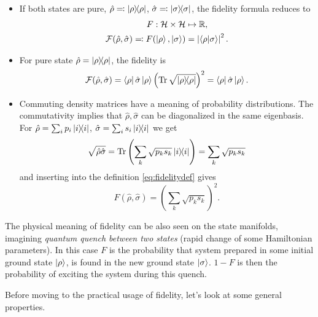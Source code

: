 \begin{itemize}
    \item If both states are pure, $\hat\rho\eqqcolon\ket{\rho}\!\!\bra{\rho}$, $\hat\sigma\eqqcolon\ket{\sigma}\!\!\bra{\sigma}$, the fidelity formula reduces to
    \begin{equation}
        \begin{split}    
            F: \mathcal{H}\times\mathcal{H}&\mapsto \mathbb{R}, \\
            \mathcal F(\hat\rho,\hat\sigma)  \eqqcolon F(\ket{\rho},\ket{\sigma}) &= \left| \braket{\rho|\sigma}\right|^2.
        \end{split}
    \end{equation}

    \item For pure state $\hat\rho=\ket{\rho}\!\!\bra{\rho}$, the fidelity is
    \begin{equation}
        \mathcal F(\hat\rho,\hat\sigma) = \bra{\rho}\hat\sigma \ket{\rho} \left(\operatorname{\textrm{Tr}}\sqrt{\ket{\rho}\!\!\bra{\rho}} \right)^2 = \bra{\rho}\hat\sigma \ket{\rho}.
    \end{equation}
    
    \item Commuting density matrices have a meaning of probability distributions. The commutativity implies that $\hat\rho,\hat\sigma$ can be diagonalized in the same eigenbasis. For $\hat\rho = \sum_i p_i \ket{i}\!\!\bra{i}$, $\hat\sigma = \sum_i s_i \ket{i}\!\!\bra{i}$ we get
    \begin{equation}
        \sqrt{\hat\rho \hat\sigma}=\operatorname{\textrm{Tr}}\left(\sum_k\sqrt{p_k s_k}\ket{i}\!\!\bra{i}\right)=\sum_k\sqrt{p_k s_k}
    \end{equation}
    and inserting into the definition \ref{eq:fidelitydef} gives
    \begin{equation}
        F(\hat\rho,\hat\sigma)=\left(\sum_k\sqrt{p_k s_k}\right)^2.
    \end{equation} 

\end{itemize}
    
    
The physical meaning of fidelity can be also seen on the state manifolds, imagining \emph{quantum quench between two states} (rapid change of some Hamiltonian parameters). In this case $F$ is the probability that system prepared in some initial ground state $\ket{\rho}$, is found in the new ground state $\ket{\sigma}$. $1-F$ is then the probability of exciting the system during this quench.

Before moving to the practical usage of fidelity, let's look at some general properties.
    

